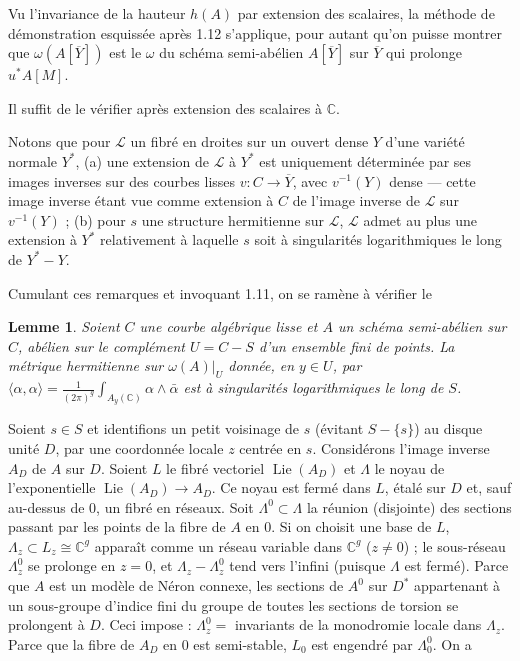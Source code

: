 \documentclass[12pt,a4paper]{article}
\theoremstyle{plain}
\newtheorem{lemma}[theorem]{Lemme}
\theoremstyle{definition}
\theoremstyle{remark}
\DeclareMathOperator{\Lie}{Lie}
\newcommand{\CC}{\mathbb{C}}
\newcommand{\cL}{\mathcal{L}}
\providecommand{\CC}{\mathbb{C}}
\providecommand{\cL}{\mathcal{L}}
\providecommand{\Lie}{\operatorname{Lie}}
\begin{document}
Vu l'invariance de la hauteur $h(A)$ par extension des scalaires, la méthode de démonstration esquissée après 1.12 s'applique, pour autant qu'on puisse montrer que $\omega(A[\overline{Y}])$ est le $\omega$ du schéma semi-abélien $A[\overline{Y}]$ sur $\overline{Y}$ qui prolonge $u^*A[M]$.

Il suffit de le vérifier après extension des scalaires à $\CC$.

Notons que pour $\cL$ un fibré en droites sur un ouvert dense $Y$ d'une variété normale $Y^*$, (a) une extension de $\cL$ à $Y^*$ est uniquement déterminée par ses images inverses sur des courbes lisses $v : C \to \overline{Y}$, avec $v^{-1}(Y)$ dense --- cette image inverse étant vue comme extension à $C$ de l'image inverse de $\cL$ sur $v^{-1}(Y)$ ; (b) pour $s$ une structure hermitienne sur $\cL$, $\cL$ admet au plus une extension à $Y^*$ relativement à laquelle $s$ soit à singularités logarithmiques le long de $Y^* - Y$.

Cumulant ces remarques et invoquant 1.11, on se ramène à vérifier le

\begin{lemma}
Soient $C$ une courbe algébrique lisse et $A$ un schéma semi-abélien sur $C$, abélien sur le complément $U = C - S$ d'un ensemble fini de points. La métrique hermitienne sur $\omega(A)|_U$ donnée, en $y \in U$, par $\langle \alpha, \alpha \rangle = \frac{1}{(2\pi)^g} \int_{A_y(\CC)} \alpha \wedge \bar{\alpha}$ est à singularités logarithmiques le long de $S$.
\end{lemma}

Soient $s \in S$ et identifions un petit voisinage de $s$ (évitant $S - \{s\}$) au disque unité $D$, par une coordonnée locale $z$ centrée en $s$. Considérons l'image inverse $A_D$ de $A$ sur $D$. Soient $L$ le fibré vectoriel $\Lie(A_D)$ et $\Lambda$ le noyau de l'exponentielle $\Lie(A_D) \to A_D$. Ce noyau est fermé dans $L$, étalé sur $D$ et, sauf au-dessus de $0$, un fibré en réseaux. Soit $\Lambda^0 \subset \Lambda$ la réunion (disjointe) des sections passant par les points de la fibre de $A$ en $0$. Si on choisit une base de $L$, $\Lambda_z \subset L_z \cong \CC^g$ apparaît comme un réseau variable dans $\CC^g$ ($z \neq 0$) ; le sous-réseau $\Lambda^0_z$ se prolonge en $z = 0$, et $\Lambda_z - \Lambda^0_z$ tend vers l'infini (puisque $\Lambda$ est fermé). Parce que $A$ est un modèle de Néron connexe, les sections de $A^0$ sur $D^*$ appartenant à un sous-groupe d'indice fini du groupe de toutes les sections de torsion se prolongent à $D$. Ceci impose : $\Lambda^0_z =$ invariants de la monodromie locale dans $\Lambda_z$. Parce que la fibre de $A_D$ en $0$ est semi-stable, $L_0$ est engendré par $\Lambda^0_0$. On a
\end{document}
